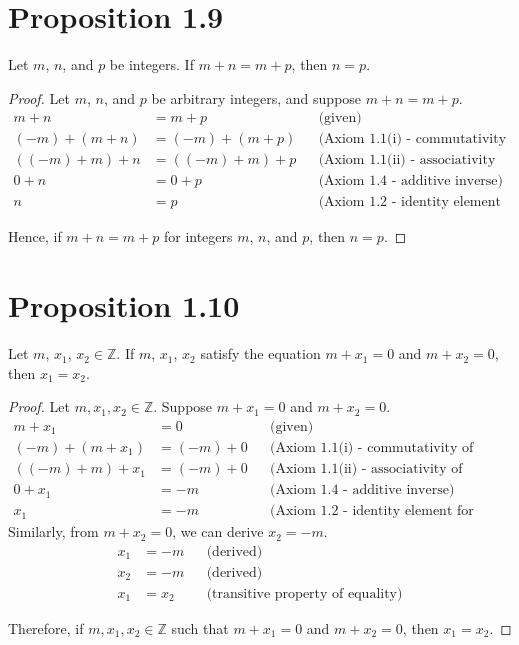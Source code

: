 \section*{Proposition 1.9}
Let $m$, $n$, and $p$ be integers. If $m+n = m+ p$, then $n = p$.
\begin{proof}
    Let $m$, $n$, and $p$ be arbitrary integers, and suppose $m + n = m + p$.
    \begin{align*}
        m + n          & = m + p          &  & \text{(given)}                                     \\
        (-m) + (m + n) & = (-m) + (m + p) &  & \text{(Axiom 1.1(i) - commutativity of addition)}  \\
        ((-m) + m) + n & = ((-m) + m) + p &  & \text{(Axiom 1.1(ii) - associativity of addition)} \\
        0 + n          & = 0 + p          &  & \text{(Axiom 1.4 - additive inverse)}              \\
        n              & = p              &  & \text{(Axiom 1.2 - identity element for addition)}
    \end{align*}

    Hence, if $m + n = m + p$ for integers $m$, $n$, and $p$, then $n = p$.
\end{proof}


\section*{Proposition 1.10}
Let $m$, $x_1$, $x_2 \in \mathbb{Z}$. If $m$, $x_1$, $x_2$ satisfy the equation $m+x_1 = 0$ and $m+x_2 = 0$, then $x_1 = x_2$.
\begin{proof}
    Let $m, x_1, x_2 \in \mathbb{Z}$. Suppose $m + x_1 = 0$ and $m + x_2 = 0$.
    \begin{align*}
        m + x_1          & = 0        &  & \text{(given)}                                     \\
        (-m) + (m + x_1) & = (-m) + 0 &  & \text{(Axiom 1.1(i) - commutativity of addition)}  \\
        ((-m) + m) + x_1 & = (-m) + 0 &  & \text{(Axiom 1.1(ii) - associativity of addition)} \\
        0 + x_1          & = -m       &  & \text{(Axiom 1.4 - additive inverse)}              \\
        x_1              & = -m       &  & \text{(Axiom 1.2 - identity element for addition)}
    \end{align*}
    Similarly, from $m + x_2 = 0$, we can derive $x_2 = -m$.
    \begin{align*}
        x_1 & = -m  &  & \text{(derived)}                         \\
        x_2 & = -m  &  & \text{(derived)}                         \\
        x_1 & = x_2 &  & \text{(transitive property of equality)}
    \end{align*}

    Therefore, if $m, x_1, x_2 \in \mathbb{Z}$ such that $m + x_1 = 0$ and $m + x_2 = 0$, then $x_1 = x_2$.
\end{proof}


